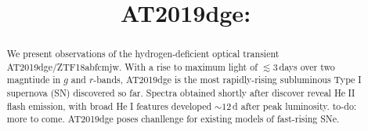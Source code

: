 \documentclass[twocolumn]{aastex63}
\def\ion#1#2{#1$\;${\footnotesize\rm{#2}}\relax}
\newcommand{\todo}[1]{{\color{magenta} to-do: {#1}}}
\begin{document}
\begin{CJK*}{UTF8}{gbsn}

\title{AT2019dge:}






\begin{abstract}

We present observations of the hydrogen-deficient optical transient AT2019dge/ZTF18abfcmjw. With 
a rise to maximum light of $\lesssim 3$\,days over two magntiude in $g$ and $r$-bands, AT2019dge is 
the most rapidly-rising subluminous Type I supernova (SN) discovered so far. Spectra obtained shortly 
after discover reveal \ion{He}{II} flash emission, with broad \ion{He}{I} features developed $\sim12$\,d 
after peak luminosity. \todo{more to come.} AT2019dge poses chanllenge for existing models of 
fast-rising SNe.

\end{abstract}




\end{CJK*}
\end{document}
